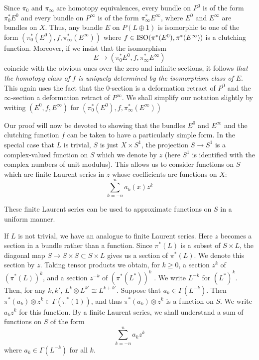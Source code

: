 Since $\pi_0$ and $\pi_\infty$ are homotopy equivalences, every bundle on $P^0$ is of the form $\pi^*_0 E^0$ and every bundle on $P^\infty$ is of the form $\pi^*_\infty E^\infty$, where $E^0$ and $E^\infty$ are bundles on $X$. Thus, any bundle $E$ on $P(L \oplus 1)$ is isomorphic to one of the form $(\pi^*_0(E^0), f, \pi^*_\infty(E^\infty))$ where $f \in \operatorname{ISO}(\pi^*(E^0), \pi^*(E^\infty))$ is a clutching function. Moreover, if we insist that the isomorphism
\begin{equation*}
    E \to (\pi^*_0 E^0, f, \pi^*_\infty E^\infty)
\end{equation*}
coincide with the obvious ones over the zero and infinite sections, it follows \textit{that the homotopy class of $f$ is uniquely determined by the isomorphism class of $E$}. This again uses the fact that the $0$-section is a deformation retract of $P^0$ and the $\infty$-section a deformation retract of $P^\infty$. We shall simplify our notation slightly by writing $(E^0, f, E^\infty)$ for $(\pi^*_0(E^0), f, \pi^*_\infty(E^\infty))$ \par 

Our proof will now be devoted to showing that the bundles $E^0$ and $E^\infty$ and the clutching function $f$ can be taken to have a particularly simple form. In the special case that $L$ is trivial, $S$ is just $X \times S^1$, the projection $S \to S^1$ is a complex-valued function on $S$ which we denote by $z$ (here $S^1$ is identified with the complex numbers of unit modulus). This allows us to consider functions on $S$ which are finite Laurent series in $z$ whose coefficients are functions on $X$:
\begin{equation*}
    \sum_{k = -n}^n a_k(x) z^k
\end{equation*}

These finite Laurent series can be used to approximate functions on $S$ in a uniform manner. \par 

If $L$ is not trivial, we have an analogue to finite Laurent series. Here $z$ becomes a section in a bundle rather than a function. Since $\pi^*(L)$ is a subset of $S \times L$, the diagonal map $S \to S \times S \subset S \times L$ gives us a section of $\pi^*(L)$. We denote this section by $z$. Taking tensor products we obtain, for $k \geq 0$, a section $z^k$ of $(\pi^*(L))^k$, and a section $z^{-k}$ of $(\pi^*(L^*))^k$ . We write $L^{-k}$ for $(L^*)^k$. Then, for any $k, k'$, $L^k \otimes L^{k'} \cong L^{k+k'}$. Suppose that $a_k \in \Gamma(L^{-k})$. Then $\pi^*(a_k) \otimes z^k \in \Gamma(\pi^*(1))$, and thus $\pi^*(a_k) \otimes z^k$ is a function on $S$. We write $a_k z^k$ for this function. By a finite Laurent series, we shall understand a sum of functions on $S$ of the form
\begin{equation*}
    \sum_{k = -n}^n a_k z^k
\end{equation*}
where $a_k \in \Gamma(L^{-k})$ for all $k$. \par 

